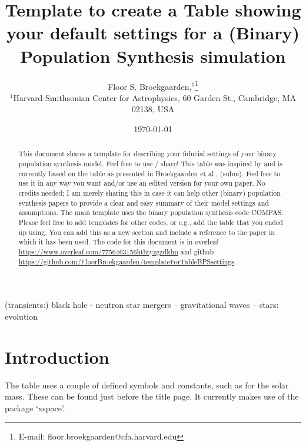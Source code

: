 \documentclass[fleqn,usenatbib, onecolumn]{mnras}
\title[BPS settings table template]{Template to create a Table showing your default settings for a (Binary) Population Synthesis simulation}
\author[]{Floor S. Broekgaarden,$^{1}$\thanks{E-mail: floor.broekgaarden@cfa.harvard.edu}
\\
$^{1}${Harvard-Smithsonian Center for Astrophysics,
60 Garden St., Cambridge, MA 02138, USA}
}
\date{\today}
\begin{document}
\label{firstpage}
\pagerange{\pageref{firstpage}--\pageref{lastpage}}
\maketitle

\begin{abstract}
This document shares a template for describing your fiducial settings of your binary population synthesis model. Feel free to use / share! This table was inspired by \citep{2018MNRAS.481.1908K} and is currently based on the table as presented in Broekgaarden et al., (subm). Feel free to use it in any way you want and/or use an edited version for your own paper. No credits needed; I am merely sharing this in case it can help other (binary) population synthesis papers to provide a clear and easy summary of their model settings and assumptions. The main template uses the binary population synthesis code COMPAS. Please  feel free to add  templates for other codes, or e.g., add the table that you ended up using. You can add this as a new section and include a reference to the paper in which it has been used. 
The code for this document is in overleaf \href{https://www.overleaf.com/7756463156hthtyzgzdkhn}{https://www.overleaf.com/7756463156hthtyzgzdkhn} and github  \href{https://github.com/FloorBroekgaarden/templateForTableBPSsettings}{https://github.com/FloorBroekgaarden/templateForTableBPSsettings}. 
\end{abstract}

\begin{keywords}
(transients:) black hole - neutron star mergers -- gravitational waves -- stars: evolution
\end{keywords}





\section{Introduction}
The table uses a couple of defined symbols and constants, such as for the solar mass. These can be found just before the title page. It currently makes use of the package `xspace'. 
\end{document}
